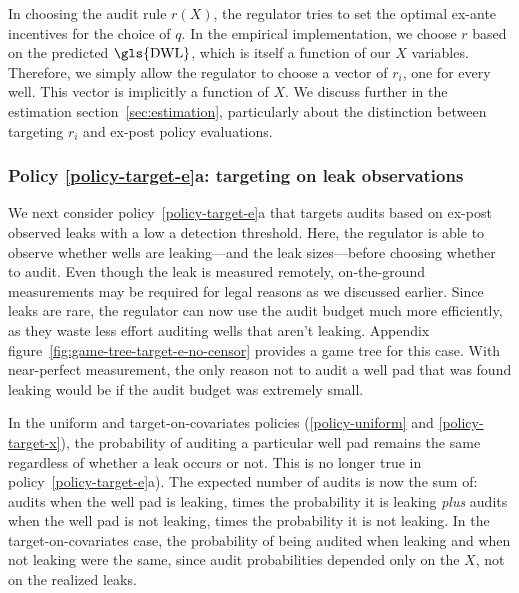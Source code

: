 \documentclass[12pt,oneside,letterpaper]{article}
\theoremstyle{definition}
\begin{document}
\begin{refsection}
In choosing the audit rule \(r(X)\), the regulator tries to set the optimal ex-ante incentives for the choice of \(q\).
In the empirical implementation, we choose \(r\) based on the predicted \(\text{\gls{DWL}}\), which is itself a function of our \(X\) variables.
Therefore, we simply allow the regulator to choose a vector of \(r_i\), one for every well.
This vector is implicitly a function of \(X\).
We discuss further in the estimation section~\ref{sec:estimation},
particularly about the distinction between targeting  \(r_i\) and ex-post policy evaluations.

\subsubsection{Policy \ref{policy-target-e}a: targeting on leak observations}
\label{sec:audit-target-e-low-threshold}

We next consider policy~\ref{policy-target-e}a that targets audits based on ex-post observed leaks with a low a detection threshold.
Here, the regulator is able to observe whether wells are leaking---and the leak sizes---before choosing whether to audit.
Even though the leak is measured remotely, on-the-ground measurements may be required for legal reasons as we discussed earlier.
Since leaks are rare, the regulator can now use the audit budget much more efficiently, as they waste less effort auditing wells that aren't leaking.
Appendix figure~\ref{fig:game-tree-target-e-no-censor} provides a game tree for this case.
With near-perfect measurement, the only reason not to audit a well pad that was found leaking would be if the audit budget was extremely small.

In the uniform and target-on-covariates policies (\ref{policy-uniform} and \ref{policy-target-x}),  the probability of auditing a particular well pad remains the same regardless of whether a leak occurs or not.
This is no longer true in policy~\ref{policy-target-e}a).
The expected number of audits is now the sum of:
audits when the well pad is leaking, times the probability it is leaking
\textit{plus}
audits when the well pad is not leaking, times the probability it is not leaking.
In the target-on-covariates case, the probability of being audited when leaking and when not leaking were the same, since audit probabilities depended only on the \(X\), not on the realized leaks.


\end{refsection}
\end{document}
